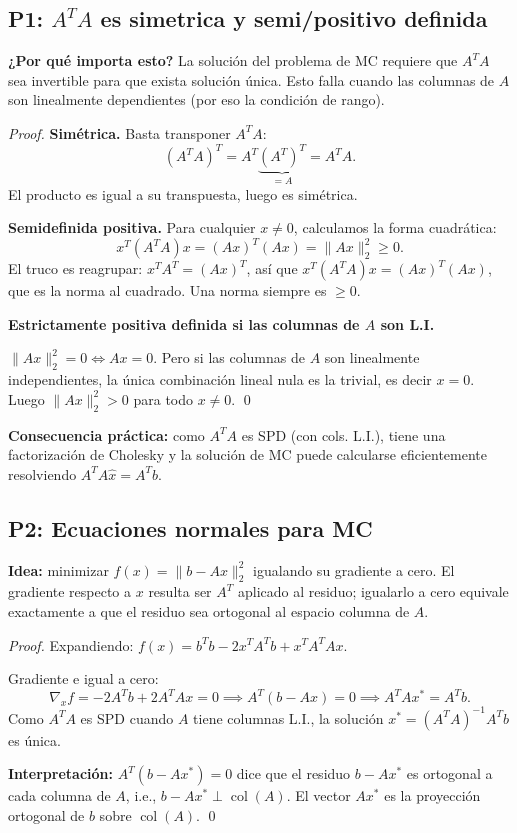 \documentclass[11pt,a4paper]{article}
\begin{document}
\subsection{P1: $A^TA$ es simetrica y semi/positivo definida}
\label{sec:q2_2017_p1}

\textbf{¿Por qué importa esto?} La solución del problema de MC requiere que $A^TA$ sea invertible para que exista solución única. Esto falla cuando las columnas de $A$ son linealmente dependientes (por eso la condición de rango).

\begin{proof}
\textbf{Simétrica.}
Basta transponer $A^TA$:
\[
  (A^TA)^T = A^T\underbrace{(A^T)^T}_{=A} = A^TA.
\]
El producto es igual a su transpuesta, luego es simétrica.

\textbf{Semidefinida positiva.}
Para cualquier $x\ne0$, calculamos la forma cuadrática:
\[
  x^T(A^TA)x = (Ax)^T(Ax) = \|Ax\|_2^2 \ge 0.
\]
El truco es reagrupar: $x^TA^T=\allowbreak(Ax)^T$, así que $x^T(A^TA)x=(Ax)^T(Ax)$, que es la norma al cuadrado. Una norma siempre es $\ge0$.

\textbf{Estrictamente positiva definida si las columnas de $A$ son L.I.}

$\|Ax\|_2^2=0 \Leftrightarrow Ax=0$. Pero si las columnas de $A$ son linealmente independientes, la única combinación lineal nula es la trivial, es decir $x=0$. Luego $\|Ax\|_2^2>0$ para todo $x\ne0$. \qed
\end{proof}

\textbf{Consecuencia práctica:} como $A^TA$ es SPD (con cols. L.I.), tiene una factorización de Cholesky y la solución de MC puede calcularse eficientemente resolviendo $A^TA\hat x=A^Tb$.

\subsection{P2: Ecuaciones normales para MC}
\label{sec:q2_2017_p2}

\textbf{Idea:} minimizar $f(x)=\|b-Ax\|_2^2$ igualando su gradiente a cero. El gradiente respecto a $x$ resulta ser $A^T$ aplicado al residuo; igualarlo a cero equivale exactamente a que el residuo sea ortogonal al espacio columna de $A$.

\begin{proof}
Expandiendo: $f(x)=b^Tb-2x^TA^Tb+x^TA^TAx$.

Gradiente e igual a cero:
\[
  \nabla_xf = -2A^Tb+2A^TAx = 0 \implies A^T(b-Ax) = 0 \implies A^TAx^* = A^Tb.
\]
Como $A^TA$ es SPD cuando $A$ tiene columnas L.I., la solución $x^*=(A^TA)^{-1}A^Tb$ es única.

\textbf{Interpretación:} $A^T(b-Ax^*)=0$ dice que el residuo $b-Ax^*$ es ortogonal a cada columna de $A$, i.e., $b-Ax^*\perp\operatorname{col}(A)$. El vector $Ax^*$ es la proyección ortogonal de $b$ sobre $\operatorname{col}(A)$. \qed
\end{proof}
\end{document}
